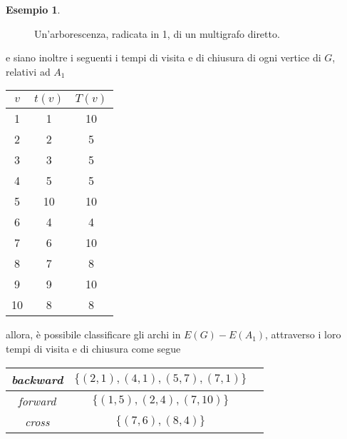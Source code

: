\documentclass[14pt]{extreport}
\theoremstyle{definition}
\theoremstyle{definition}
\newtheorem{example}{Esempio}[subsection]
\begin{document}
\begin{example}
\begin{figure}[H]
        \caption{Un'arborescenza, radicata in 1, di un multigrafo diretto.}
    \end{figure}

    e siano inoltre i seguenti i tempi di visita e di chiusura di ogni vertice di $G$, relativi ad $A_1$

    \begin{center}
        \begin{tabular}{c|c c} 
             \hline
             $v$ & $t(v)$ & $T(v)$ \\
             \hline\hline
             1 & 1 & 10 \\ 
             \hline
             2 & 2 & 5 \\
             \hline
             3 & 3 & 5 \\
             \hline
             4 & 5 & 5 \\
             \hline
             5 & 10 & 10 \\
             \hline
             6 & 4 & 4 \\
             \hline
             7 & 6 & 10 \\
             \hline
             8 & 7 & 8 \\
             \hline
             9 & 9 & 10 \\
             \hline
             10 & 8 & 8 \\
             \hline
        \end{tabular}
    \end{center}

    allora, è possibile classificare gli archi in $E(G) - E(A_1)$, attraverso i loro tempi di visita e di chiusura come segue 

    \begin{center}
        \begin{tabular}{c||c c} 
             \hline
             \textit{backward} & $\{(2, 1), (4, 1), (5, 7), (7, 1)\}$ \\
             \hline
             \textit{forward} & $\{(1, 5), (2, 4), (7, 10)\}$\\ 
             \hline
             \textit{cross} & $\{(7, 6), (8, 4)\}$\\
             \hline
        \end{tabular}
    \end{center}
\end{example}
\end{document}
